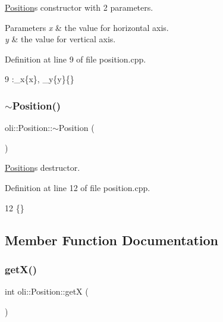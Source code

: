 \hyperlink{classoli_1_1_position}{Position}\textquotesingle{}s constructor with 2 parameters. 


\begin{DoxyParams}{Parameters}
{\em x} & the value for horizontal axis. \\
\hline
{\em y} & the value for vertical axis. \\
\hline
\end{DoxyParams}


Definition at line 9 of file position.\+cpp.


\begin{DoxyCode}
9 :\_x\{x\}, \_y\{y\}\{\}
\end{DoxyCode}
\hypertarget{classoli_1_1_position_a30cbb2de832fec8a5619d600131a3aee}{}\label{classoli_1_1_position_a30cbb2de832fec8a5619d600131a3aee} 
\subsubsection{\texorpdfstring{$\sim$\+Position()}{~Position()}}
{\footnotesize\ttfamily oli\+::\+Position\+::$\sim$\+Position (\begin{DoxyParamCaption}{ }\end{DoxyParamCaption})}



\hyperlink{classoli_1_1_position}{Position}\textquotesingle{}s destructor. 



Definition at line 12 of file position.\+cpp.


\begin{DoxyCode}
12 \{\}
\end{DoxyCode}


\subsection{Member Function Documentation}
\hypertarget{classoli_1_1_position_afe4474780d03f71339d059b7742ad6e8}{}\label{classoli_1_1_position_afe4474780d03f71339d059b7742ad6e8} 
\subsubsection{\texorpdfstring{get\+X()}{getX()}}
{\footnotesize\ttfamily int oli\+::\+Position\+::getX (\begin{DoxyParamCaption}{ }\end{DoxyParamCaption})}



